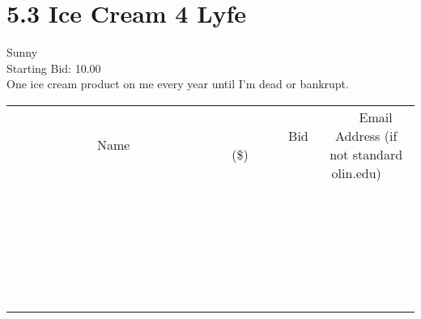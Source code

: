 \documentclass[11pt]{article}
\begin{document}
					\section*{5.3 Ice Cream 4 Lyfe}
					Sunny \\
					Starting Bid: 10.00 \\
					One ice cream product on me every year until I'm dead or bankrupt. \\
					[6ex]
					\begin{tabular}{c c c}
						~~~~~~~~~~~~~Name~~~~~~~~~~~~~ & ~~~~~~~~~Bid (\$)~~~~~~~~~ & ~~~Email Address (if not standard olin.edu)~~~ \\
				
 & & \\
\hline
 & & \\
\hline
 & & \\
\hline
 & & \\
\hline
 & & \\
\hline
 & & \\
\hline
 & & \\
\hline
 & & \\
\hline
 & & \\
\hline
 & & \\
\hline
 & & \\
\hline
 & & \\
\hline
 & & \\
\hline
 & & \\
\hline
 & & \\
\hline
 & & \\
\hline
 & & \\
\hline
 & & \\
\hline
 & & \\
\hline
 & & \\
\hline
 & & \\
\hline
 & & \\
\hline
 & & \\
\hline
 & & \\
\hline
 & & \\
\hline
 & & \\
\hline
					\end{tabular}
					\clearpage
				
\end{document}
